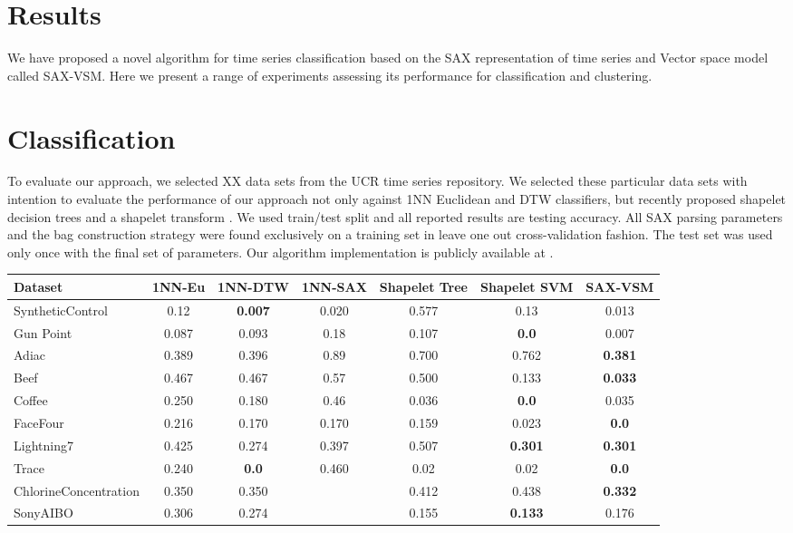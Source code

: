 \documentclass{llncs}
\begin{document}
\section{Results}
We have proposed a novel algorithm for time series classification based on the SAX
representation of time series and Vector space model called SAX-VSM. Here we present a range of
experiments assessing its performance for classification and clustering.

\section{Classification}
To evaluate our approach, we selected XX data sets from the UCR time series repository.
We selected these particular data sets with intention to evaluate the performance of our approach
not only against 1NN Euclidean and DTW classifiers, but recently proposed shapelet decision trees
and a shapelet transform \cite{bagnal}.
We used train/test split and all reported results are testing accuracy. All SAX parsing parameters
and the bag construction strategy were found exclusively on a training set in leave one out 
cross-validation fashion. The test set was used only once with the final set of parameters. 
Our algorithm implementation is publicly available at \cite{jmotif}.

{\scriptsize

\begin{tabular}{|  l | c | c | c | c | c |  c | }
  \hline
  Dataset & 1NN-Eu & 1NN-DTW & 1NN-SAX & Shapelet Tree & Shapelet SVM & SAX-VSM \\
  \hline
  SyntheticControl  & 0.12   & \textbf{0.007}  & 0.020   & 0.577   & 0.13 & 0.013 \\
  Gun Point         & 0.087  & 0.093   & 0.18  & 0.107   & \textbf{0.0}   & 0.007 \\
  Adiac             & 0.389  & 0.396   & 0.89  & 0.700   & 0.762   & \textbf{0.381} \\
  Beef              & 0.467  & 0.467   & 0.57  & 0.500   & 0.133   & \textbf{0.033} \\
  Coffee            & 0.250   & 0.180    & 0.46  & 0.036  & \textbf{0.0} & 0.035 \\
  FaceFour          & 0.216 & 0.170   & 0.170  & 0.159 & 0.023 & \textbf{0.0} \\
  Lightning7        & 0.425 & 0.274  & 0.397 & 0.507 & \textbf{0.301} & \textbf{0.301} \\
  Trace             & 0.240 & \textbf{0.0} & 0.460 & 0.02 & 0.02 & \textbf{0.0} \\
  \hline
  ChlorineConcentration  & 0.350 & 0.350 &  & 0.412 & 0.438 & \textbf{0.332} \\
  SonyAIBO          & 0.306 & 0.274  &  & 0.155 & \textbf{0.133} & 0.176 \\
  
  \hline
\end{tabular}

}
\end{document}
